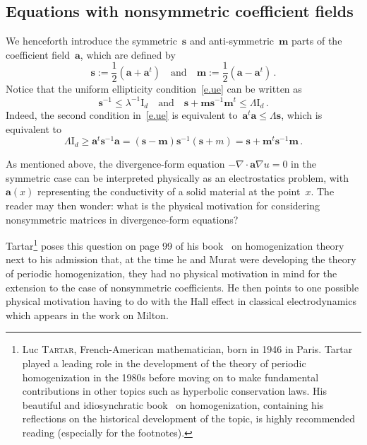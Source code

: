 \documentclass[11pt]{article} %
\numberwithin{equation}{section}
\theoremstyle{definition}
\newcommand*{\Id}{\ensuremath{\mathrm{I}_d}}
\newcommand{\s}{\mathbf{s}}
\renewcommand{\a}{\mathbf{a}}
\newcommand{\m}{\mathbf{m}}
\begin{document}
\subsection{Equations with nonsymmetric coefficient fields}
\label{ss.nonsymm}

We henceforth introduce the symmetric~$\s$ and anti-symmetric~$\m$ parts of the coefficient field~$\a$, which are defined by 
\begin{equation*}
\s := \frac12(\a+\a^t)
\quad \mbox{and} \quad 
\m := \frac12(\a-\a^t)\,. 
\end{equation*}
Notice that the uniform ellipticity condition~\eqref{e.ue} can be written as 
\begin{equation}
\label{e.ellipticity.nonsymm}
\s^{-1} \leq \lambda^{-1}  \Id 
\quad \mbox{and} \quad
\s + \m\s^{-1}\m^t \leq \Lambda  \Id\,.
\end{equation}
Indeed, the second condition in~\eqref{e.ue} is equivalent to~$\a^t \a \leq \Lambda \s$, which is equivalent to
\begin{equation*}
\Lambda  \Id \geq \a^t \s^{-1} \a  =  
 (\s-\m) \s^{-1} (\s+m) = \s + \m^t \s^{-1} \m \,.
\end{equation*}

As mentioned above, the divergence-form equation $-\nabla \cdot \a \nabla u = 0$ in the symmetric case can be interpreted physically as an electrostatics problem, with $\a(x)$ representing the conductivity of a solid material at the point~$x$. The reader may then wonder: what is the physical motivation for considering nonsymmetric matrices in divergence-form equations?

\smallskip 

Tartar\footnote{Luc \textsc{Tartar}, French-American mathematician, born in 1946 in Paris. Tartar played a leading role in the development of the theory of periodic homogenization in the 1980s before moving on to make fundamental contributions in other topics such as hyperbolic conservation laws. His beautiful and idiosynchratic book~\cite{T} on homogenization, containing his reflections on the historical development of the topic, is highly recommended reading (especially for the footnotes).} 
poses this question on page 99 of his book~\cite{T} on homogenization theory next to his admission that, at the time he and Murat were developing the theory of periodic homogenization, they had no physical motivation in mind for the extension to the case of nonsymmetric coefficients. He then points to one possible physical motivation having to do with the Hall effect in classical electrodynamics which appears in the work on Milton. 
\end{document}
